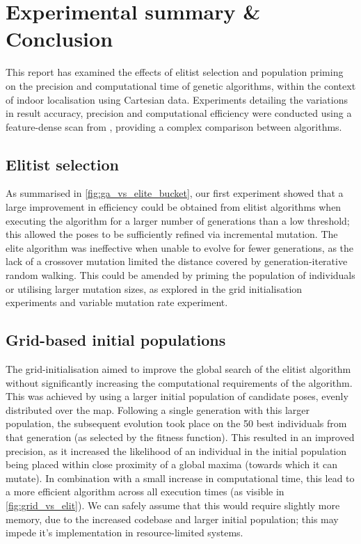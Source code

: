 \documentclass[authoryearcitations]{UoYCSproject}
\begin{document}

\chapter{Experimental summary \& Conclusion}
This report has examined the effects of elitist selection and population priming on the precision and computational time of genetic algorithms, within the context of indoor localisation using Cartesian data. Experiments detailing the variations in result accuracy, precision and computational efficiency were conducted using a feature-dense scan from \citet{Lenac2011-co}, providing a complex comparison between algorithms.

\section{Elitist selection}
As summarised in \autoref{fig:ga_vs_elite_bucket}, our first experiment showed that a large improvement in efficiency could be obtained from elitist algorithms when executing the algorithm for a larger number of generations than a low threshold; this allowed the poses to be sufficiently refined via incremental mutation. The elite algorithm was ineffective when unable to evolve for fewer generations, as the lack of a crossover mutation limited the distance covered by generation-iterative random walking. This could be amended by priming the population of individuals or utilising larger mutation sizes, as explored in the grid initialisation experiments and variable mutation rate experiment.

\section{Grid-based initial populations}
The grid-initialisation aimed to improve the global search of the elitist algorithm without significantly increasing the computational requirements of the algorithm. This was achieved by using a larger initial population of candidate poses, evenly distributed over the map. Following a single generation with this larger population, the subsequent evolution took place on the 50 best individuals from that generation (as selected by the fitness function). This resulted in an improved precision, as it increased the likelihood of an individual in the initial population being placed within close proximity of a global maxima (towards which it can mutate). In combination with a small increase in computational time, this lead to a more efficient algorithm across all execution times (as visible in \autoref{fig:grid_vs_elit}). We can safely assume that this would require slightly more memory, due to the increased codebase and larger initial population; this may impede it's implementation in resource-limited systems. 
\end{document}
